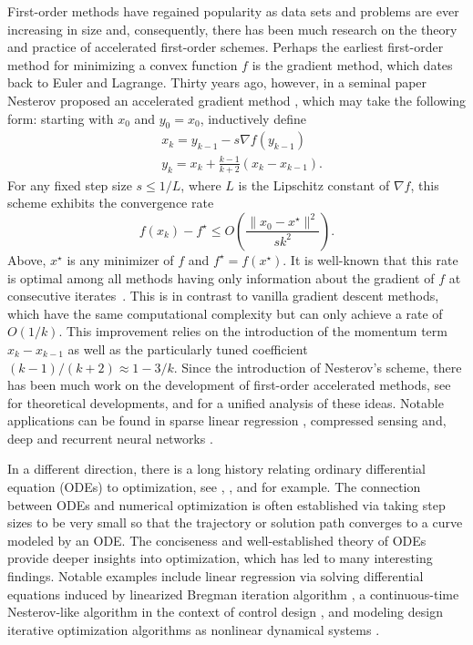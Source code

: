 \documentclass[twoside,11pt]{article}
\begin{document}
First-order methods have regained popularity as data sets and problems
are ever increasing in size and, consequently, there has been much
research on the theory and practice of accelerated first-order
schemes.  Perhaps the earliest first-order method for minimizing a
convex function $f$ is the gradient method, which dates back to Euler
and Lagrange. Thirty years ago, however, in a seminal paper Nesterov
proposed an accelerated gradient method \citep{nesterov}, which may
take the following form: starting with $x_0$ and $y_0 = x_0$,
inductively define
\begin{equation}\label{eq:nesterov-scheme}
\begin{aligned}  
& x_k = y_{k-1} - s\nabla f(y_{k-1})\\
& y_k = x_k + \frac{k-1}{k+2} (x_k - x_{k-1}).
\end{aligned}
\end{equation}
For any fixed step size $s \le 1/L$, where $L$ is the Lipschitz constant of $\nabla f$, this scheme exhibits the convergence rate
\begin{equation}\label{eq:sk_quad_err}
f(x_k) - f^\star \le O \left(\frac{\|x_0 - x^\star\|^2}{sk^2} \right).
\end{equation}
Above, $x^\star$ is any minimizer of $f$ and $f^\star = f(x^\star)$. It is well-known that this rate is optimal among all methods having only information about the gradient of $f$ at consecutive iterates~\citep{nesterov-book}. This is in contrast to vanilla gradient descent methods, which have the same computational complexity but can only achieve a rate of $O(1/k)$. This improvement relies on the introduction of the momentum term $x_k-x_{k-1}$ as well as the particularly tuned coefficient $(k-1)/(k+2)\approx 1 - 3/k$. Since the introduction of Nesterov's scheme, there has been much work on the development of first-order accelerated methods, see \citet{nesterov-book, nesterovsmooth, nesterov_compo} for theoretical developments, and \citet{tseng} for a unified analysis of these ideas. Notable applications can be found in sparse linear regression \citep{BeckTeboulle, qin2012}, compressed sensing \citep{becker} and, deep and recurrent neural networks \citep{sutskever2013}.

In a different direction, there is a long history relating ordinary differential equation (ODEs) to optimization, see \citet{dynamic}, \citet{schropp}, and \citet{fiori2005} for example. The connection between ODEs and numerical optimization is often established via taking step sizes to be very small so that the trajectory or solution path converges to a curve modeled by an ODE. The conciseness and well-established theory of ODEs provide deeper insights into optimization, which has led to many interesting findings. Notable examples include linear regression via solving differential equations induced by linearized Bregman iteration algorithm \citep{osher2014sparse}, a continuous-time Nesterov-like algorithm in the context of control design \citep{durr2012a, durr2012b}, and modeling design iterative optimization algorithms as nonlinear dynamical systems \citep{recht}.
\end{document}
